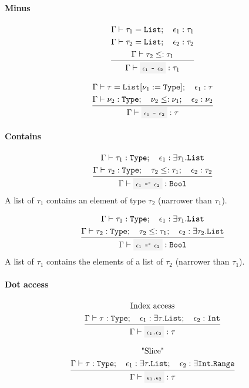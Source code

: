 \paragraph{Minus}

\[
	\infrule{
		\EnvSym\then \tau_1=\List \semiq \expr_1:\tau_1 \\*
		\EnvSym\then \tau_2=\List \semiq \expr_2:\tau_2 \\*
		\EnvSym\then \tau_2 \narreq \tau_1
	}{
		\EnvSym\then \code{$\expr_1$ - $\expr_2$} : \tau_1
	}
\]

\[
	\infrule{
		\EnvSym\then \tau=\List[\nu_1:=\Type] \semiq \expr_1:\tau \\*
		\EnvSym\then \nu_2:\Type \semiq \nu_2\narreq\nu_1 \semiq \expr_2:\nu_2
	}{
		\EnvSym\then \code{$\expr_1$ - $\expr_2$} : \tau
	}
\]

\paragraph{Contains}

\[
	\infrule{
		\EnvSym\then \tau_1:\Type \semiq \expr_1:\exists\tau_1.\List \\*
		\EnvSym\then \tau_2:\Type \semiq \tau_2 \narreq \tau_1 \semiq \expr_2:\tau_2
	}{
		\EnvSym\then \code{$\expr_1$ =\~{} $\expr_2$} : \Bool
	}
\]
A list of $\tau_1$ contains an element of type $\tau_2$ (narrower than
$\tau_1$).

\[
	\infrule{
		\EnvSym\then \tau_1:\Type \semiq \expr_1:\exists\tau_1.\List\\*
		\EnvSym\then \tau_2:\Type \semiq \tau_2 \narreq \tau_1 \semiq \expr_2:\exists\tau_2.\List
	}{
		\EnvSym\then \code{$\expr_1$ =\~{} $\expr_2$} : \Bool
	}
\]
A list of $\tau_1$ contains the elements of a list of $\tau_2$ (narrower than
$\tau_1$).

\paragraph{Dot access}

\[
	\infrule{
		\text{Index access}\\*
		\EnvSym\then \tau:\Type
		\semiq \expr_1:\exists\tau.\List
		\semiq \expr_2:\Int
	}{
		\EnvSym\then \code{$\expr_1$.$\expr_2$}: \tau
	}
\]

\[
	\infrule{
		\text{"Slice"}\\*
		\EnvSym\then \tau : \Type
		\semiq \expr_1:\exists\tau.\List
		\semiq \expr_2:\exists\Int.\Range
	}{
		\EnvSym\then \code{$\expr_1$.$\expr_2$}: \tau
	}
\]

